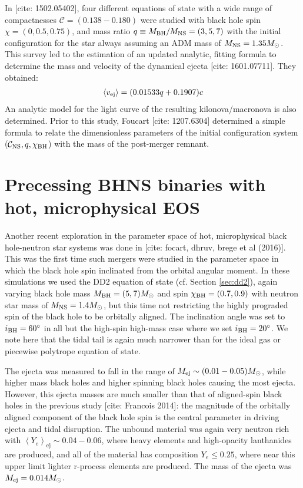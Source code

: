 In [cite: 1502.05402], four different equations of state with a wide range of compactnesses $\mathcal{C} = (0.138 - 0.180)$ were studied with black hole spin $\chi = (0, 0.5, 0.75)$, and mass ratio $q \equiv M_{\rm BH}/M_{\rm NS} = (3, 5, 7)$ with the initial configuration for the star always assuming an ADM mass of $M_{\rm NS} = 1.35 M_\odot$.
This survey led to the estimation of an updated analytic, fitting formula to determine the mass and velocity of the dynamical ejecta [cite: 1601.07711].  They obtained:
\begin{align}
\label{e:vej_sacra}
\left\langle v_{\rm ej} \right\rangle = (0.01533 q + 0.1907) c
\end{align}
An analytic model for the light curve of the resulting kilonova/macronova is also determined.
Prior to this study, Foucart [cite: 1207.6304] determined a simple formula to relate the dimensionless parameters of the initial configuration system ($\mathcal{C}_{\rm NS}, q, \chi_{\rm BH} $)  with the mass of the post-merger remnant.


\section{Precessing BHNS binaries with hot, microphysical EOS}

Another recent exploration in the parameter space of hot, microphysical black hole-neutron star systems was done in [cite: focart, dhruv, brege et al (2016)].
This was the first time such mergers were studied in the parameter space in which the black hole spin inclinated from the orbital angular moment. 
In these simulations we used the DD2 equation of state (cf. Section \ref{sec:dd2}), again varying black hole mass $M_{\rm BH} = (5, 7) M_\odot$ and spin $\chi_{\rm BH} = (0.7, 0.9)$ with neutron star mass of $M_{\rm NS} = 1.4 M_\odot$, but this time not restricting the highly prograded spin of the black hole to be orbitally aligned.  The inclination angle was set to $i_{\rm BH}=60^{\circ}$ in all but the high-spin high-mass case where we set $i_{\rm BH}=20^{\circ}$.  We note here that the tidal tail is again much narrower than for the ideal gas or piecewise polytrope equation of state.  

The ejecta was measured to fall in the range of $M_{\rm ej} \sim (0.01 - 0.05) M_\odot$, while higher mass black holes and higher spinning black holes causing the most ejecta.  However, this ejecta masses are much smaller than that of aligned-spin black holes in the previous study [cite: Francois 2014]: the magnitude of the orbitally aligned component of the black hole spin is the central parameter in driving ejecta and tidal disruption.  The unbound material was again very neutron rich with $\left\langle Y_e \right\rangle_\textrm{ej} \sim 0.04 - 0.06$, where heavy elements and high-opacity lanthanides are produced, and all of the material has composition $Y_e \le 0.25$, where near this upper limit lighter r-process elements are produced.  The mass of the ejecta was $M_{\rm ej} = 0.014 M_\odot$.

